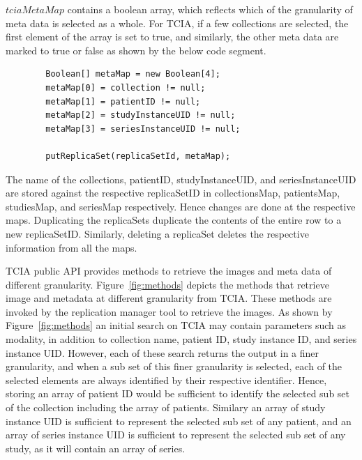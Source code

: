 \documentclass[conference]{IEEEtran}
\begin{document}
$tciaMetaMap$ contains a boolean array, which reflects which of the granularity of meta data is selected as a whole. For TCIA, if a few collections are selected, the first element of the array is set to true, and similarly, the other meta data are marked to true or false as shown by the below code segment.
\begin{lstlisting}  
        Boolean[] metaMap = new Boolean[4];
        metaMap[0] = collection != null;
        metaMap[1] = patientID != null;
        metaMap[2] = studyInstanceUID != null;
        metaMap[3] = seriesInstanceUID != null;

        putReplicaSet(replicaSetId, metaMap);
\end{lstlisting} 
The name of the collections, patientID, studyInstanceUID, and seriesInstanceUID are stored against the respective replicaSetID in collectionsMap, patientsMap, studiesMap, and seriesMap respectively. Hence changes are done at the respective maps. Duplicating the replicaSets duplicate the contents of the entire row to a new replicaSetID. Similarly, deleting a replicaSet deletes the respective information from all the maps.

TCIA public API provides methods to retrieve the images and meta data of different granularity. Figure~\ref{fig:methods} depicts the methods that retrieve image and metadata at different granularity from TCIA. These methods are invoked by the replication manager tool to retrieve the images. As shown by Figure~\ref{fig:methods} an initial search on TCIA may contain parameters such as modality, in addition to collection name, patient ID, study instance ID, and series instance UID. However, each of these search returns the output in a finer granularity, and when a sub set of this finer granularity is selected, each of the selected elements are always identified by their respective identifier. Hence, storing an array of patient ID would be sufficient to identify the selected sub set of the collection including the array of patients. Similary an array of study instance UID is sufficient to represent the selected sub set of any patient, and an array of series instance UID is sufficient to represent the selected sub set of any study, as it will contain an array of series.
\end{document}
